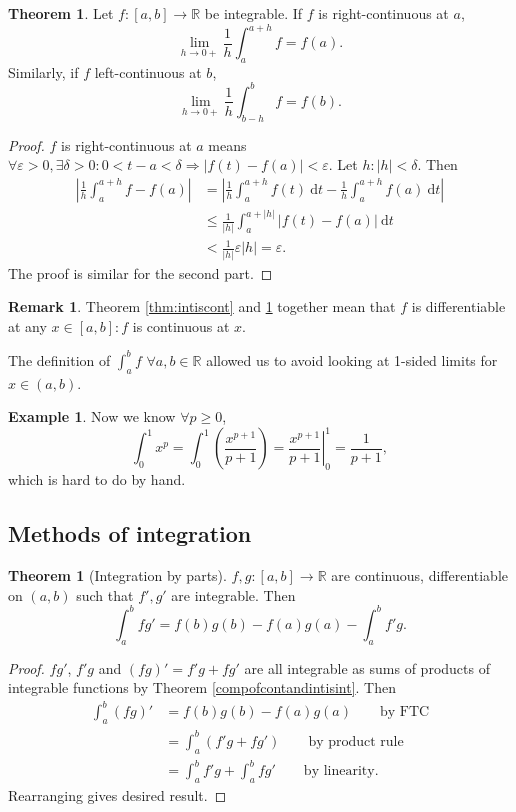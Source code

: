\documentclass[a4paper]{article}
\theoremstyle{definition}
\newtheorem{thm}[defn]{Theorem}
\newtheorem{example}[defn]{Example}
\newtheorem*{remark}{Remark}
\begin{document}
\begin{thm}
\label{thm:boundlimofintf}
Let $f:[a,b]\rightarrow \mathbb R$ be integrable. If $f$ is right-continuous at $a$,
\[
\lim_{h\rightarrow 0+} \frac1h \int_a^{a+h} f=f(a).
\]
Similarly, if $f$ left-continuous at $b$,
\[
\lim_{h\rightarrow 0+} \frac1h \int_{b-h}^b f=f(b).
\]
\end{thm}
\begin{proof}
$f$ is right-continuous at $a$ means $\forall \varepsilon >0, \exists \delta >0: 0<t-a<\delta \Rightarrow |f(t)-f(a)|<\varepsilon$. Let $h:|h|<\delta $. Then
\[
\begin{aligned}
    \left|\frac{1}{h}\int_a^{a+h}f-f(a) \right| &= \left|\frac{1}{h}\int_a^{a+h}f(t) \ \mathrm d t-\frac1h \int_a^{a+h} f(a) \ \mathrm d t \right| \\
    &\leq \frac{1}{|h|} \int_a^{a+|h|} |f(t)-f(a)| \ \mathrm d t \\
    &< \frac{1}{|h|}\varepsilon |h|=\varepsilon .
\end{aligned}
\]
The proof is similar for the second part.
\end{proof}
\begin{remark}
Theorem \ref{thm:intiscont} and \ref{thm:boundlimofintf} together mean that $f$ is differentiable at any $x\in [a,b] : f$ is continuous at $x$.
\end{remark}
The definition of $\int_a^b f$ $\forall a,b\in \mathbb R$ allowed us to avoid looking at 1-sided limits for $x\in (a,b)$.
\begin{example}
Now we know $\forall p\geq 0$,
\[
\int_0^1 x^p = \int_0^1 \left( \frac{x^{p+1}}{p+1} \right)=\left. \frac{x^{p+1}}{p+1} \right|_0^1=\frac{1}{p+1},
\]
which is hard to do by hand.
\end{example}

\subsection{Methods of integration}
\begin{thm}[Integration by parts]
$f,g:[a,b]\rightarrow \mathbb R$ are continuous, differentiable on $(a,b)$ such that $f',g'$ are integrable. Then
\[
\int_a^b fg' = f(b)g(b)-f(a)g(a)-\int_a^b f'g .
\]
\end{thm}
\begin{proof}
$fg'$, $f'g$ and $(fg)'=f'g+fg'$ are all integrable as sums of products of integrable functions by Theorem \ref{compofcontandintisint}. Then
\[
\begin{aligned}
    \int_a^b (fg)'&=f(b)g(b)-f(a)g(a) \qquad \text{by FTC}\\
    &=\int_a^b (f'g+fg') \qquad \text{by product rule} \\
    &=\int_a^b f'g + \int_a^b fg'\qquad \text{by linearity} .
\end{aligned}
\]
Rearranging gives desired result.
\end{proof}
\end{document}
